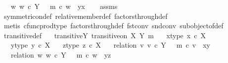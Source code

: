 \begin{isabellebody}
\ \ \ {\isachardoublequoteopen}{\isasymexists}w{\isachardot}{\kern0pt}\ w\ {\isasymin}\isactrlsub c\ Y\ {\isasymand}\ \ m\ {\isasymcirc}\isactrlsub c\ w\ {\isacharequal}{\kern0pt}\ {\isasymlangle}y{\isacharcomma}{\kern0pt}x{\isasymrangle}{\isachardoublequoteclose}\isanewline
%
\isadelimproof
\ \ %
\endisadelimproof
%
\isatagproof
{}\isamarkupfalse%
\ assms\ \isamarkupfalse%
\ symmetric{\isacharunderscore}{\kern0pt}on{\isacharunderscore}{\kern0pt}def\ relative{\isacharunderscore}{\kern0pt}member{\isacharunderscore}{\kern0pt}def\ factors{\isacharunderscore}{\kern0pt}through{\isacharunderscore}{\kern0pt}def{}\isanewline
\ \ \isamarkupfalse%
\ {\isacharparenleft}{\kern0pt}metis\ cfunc{\isacharunderscore}{\kern0pt}prod{\isacharunderscore}{\kern0pt}type\ factors{\isacharunderscore}{\kern0pt}through{\isacharunderscore}{\kern0pt}def{}\ fst{\isacharunderscore}{\kern0pt}conv\ snd{\isacharunderscore}{\kern0pt}conv\ subobject{\isacharunderscore}{\kern0pt}of{\isacharunderscore}{\kern0pt}def{}{\isacharparenright}{\kern0pt}%
\endisatagproof
{\isafoldproof}%
%
\isadelimproof
\isanewline
%
\endisadelimproof
\isanewline
{}\isamarkupfalse%
\ transitive{\isacharunderscore}{\kern0pt}def{}{\isacharcolon}{\kern0pt}\isanewline
\ \ \ transitive{\isacharunderscore}{\kern0pt}Y{\isacharcolon}{\kern0pt}\ {\isachardoublequoteopen}transitive{\isacharunderscore}{\kern0pt}on\ X\ {\isacharparenleft}{\kern0pt}Y{\isacharcomma}{\kern0pt}\ m{\isacharparenright}{\kern0pt}{\isachardoublequoteclose}\isanewline
\ \ \ x{\isacharunderscore}{\kern0pt}type{\isacharcolon}{\kern0pt}\ {\isachardoublequoteopen}x\ {\isasymin}\isactrlsub c\ X{\isachardoublequoteclose}\isanewline
\ \ \ y{\isacharunderscore}{\kern0pt}type{\isacharcolon}{\kern0pt}\ {\isachardoublequoteopen}y\ {\isasymin}\isactrlsub c\ X{\isachardoublequoteclose}\isanewline
\ \ \ z{\isacharunderscore}{\kern0pt}type{\isacharcolon}{\kern0pt}\ {\isachardoublequoteopen}z\ {\isasymin}\isactrlsub c\ X{\isachardoublequoteclose}\isanewline
\ \ \ relation{}{\isacharcolon}{\kern0pt}\ {\isachardoublequoteopen}{\isasymexists}v{\isachardot}{\kern0pt}\ v\ {\isasymin}\isactrlsub c\ Y\ {\isasymand}\ \ m\ {\isasymcirc}\isactrlsub c\ v\ {\isacharequal}{\kern0pt}\ {\isasymlangle}x{\isacharcomma}{\kern0pt}y{\isasymrangle}{\isachardoublequoteclose}\isanewline
\ \ \ relation{}{\isacharcolon}{\kern0pt}\ {\isachardoublequoteopen}{\isasymexists}w{\isachardot}{\kern0pt}\ w\ {\isasymin}\isactrlsub c\ Y\ {\isasymand}\ \ m\ {\isasymcirc}\isactrlsub c\ w\ {\isacharequal}{\kern0pt}\ {\isasymlangle}y{\isacharcomma}{\kern0pt}z{\isasymrangle}{\isachardoublequoteclose}\isanewline

\end{isabellebody}
